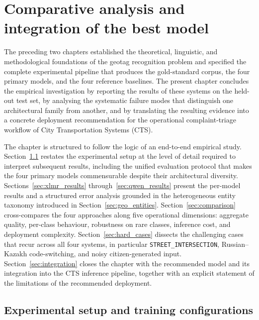 %

\chapter{Comparative analysis and integration of the best model}
\label{chap:results}

The preceding two chapters established the theoretical, linguistic, and methodological foundations of the geotag recognition problem and specified the complete experimental pipeline that produces the gold-standard corpus, the four primary models, and the four reference baselines. The present chapter concludes the empirical investigation by reporting the results of these systems on the held-out test set, by analysing the systematic failure modes that distinguish one architectural family from another, and by translating the resulting evidence into a concrete deployment recommendation for the operational complaint-triage workflow of City Transportation Systems (CTS).

The chapter is structured to follow the logic of an end-to-end empirical study. Section~\ref{sec:exp_setup} restates the experimental setup at the level of detail required to interpret subsequent results, including the unified evaluation protocol that makes the four primary models commensurable despite their architectural diversity. Sections~\ref{sec:xlmr_results} through~\ref{sec:qwen_results} present the per-model results and a structured error analysis grounded in the heterogeneous entity taxonomy introduced in Section~\ref{sec:geo_entities}. Section~\ref{sec:comparison} cross-compares the four approaches along five operational dimensions: aggregate quality, per-class behaviour, robustness on rare classes, inference cost, and deployment complexity. Section~\ref{sec:hard_cases} dissects the challenging cases that recur across all four systems, in particular \texttt{STREET\_INTERSECTION}, Russian--Kazakh code-switching, and noisy citizen-generated input. Section~\ref{sec:integration} closes the chapter with the recommended model and its integration into the CTS inference pipeline, together with an explicit statement of the limitations of the recommended deployment.

\section{Experimental setup and training configurations}
\label{sec:exp_setup}

